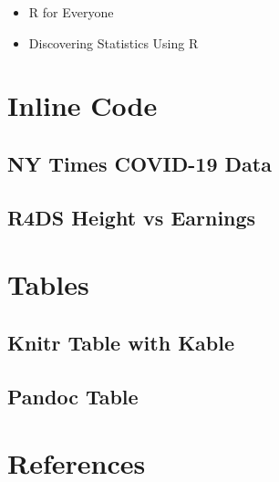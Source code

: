 \documentclass[
]{article}
\providecommand{\tightlist}{%
  \setlength{\itemsep}{0pt}\setlength{\parskip}{0pt}}
\begin{document}
\begin{itemize}
\tightlist
\item
  R for Everyone
\item
  Discovering Statistics Using R
\end{itemize}

\hypertarget{inline-code}{%
\section{Inline Code}\label{inline-code}}

\hypertarget{ny-times-covid-19-data}{%
\subsection{NY Times COVID-19 Data}\label{ny-times-covid-19-data}}

\hypertarget{r4ds-height-vs-earnings}{%
\subsection{R4DS Height vs Earnings}\label{r4ds-height-vs-earnings}}

\hypertarget{tables}{%
\section{Tables}\label{tables}}

\hypertarget{knitr-table-with-kable}{%
\subsection{Knitr Table with Kable}\label{knitr-table-with-kable}}

\hypertarget{pandoc-table}{%
\subsection{Pandoc Table}\label{pandoc-table}}

\hypertarget{references}{%
\section{References}\label{references}}
\end{document}
